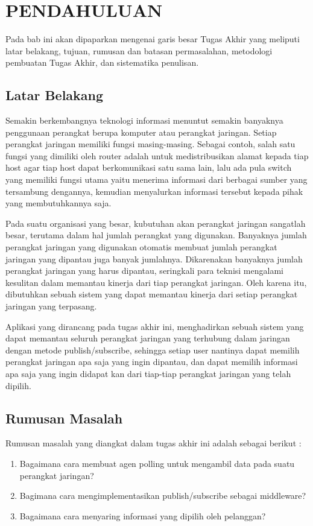 \chapter{PENDAHULUAN}
	Pada bab ini akan dipaparkan mengenai garis besar Tugas Akhir yang meliputi latar belakang, tujuan, rumusan dan batasan permasalahan, metodologi pembuatan Tugas Akhir, dan sistematika penulisan.
        
	\section{Latar Belakang}
		Semakin berkembangnya teknologi informasi menuntut semakin banyaknya penggunaan perangkat berupa komputer atau perangkat jaringan. Setiap perangkat jaringan memiliki fungsi masing-masing. Sebagai contoh, salah satu fungsi yang dimiliki oleh router adalah untuk medistribusikan alamat kepada tiap host agar tiap host dapat berkomunikasi satu sama lain, lalu ada pula switch yang memiliki fungsi utama yaitu menerima informasi dari berbagai sumber yang tersambung dengannya, kemudian menyalurkan informasi tersebut kepada pihak yang membutuhkannya saja.
		
		Pada suatu organisasi yang besar, kubutuhan akan perangkat jaringan sangatlah besar, terutama dalam hal jumlah perangkat yang digunakan. Banyaknya jumlah perangkat jaringan yang digunakan otomatis membuat jumlah perangkat jaringan yang dipantau juga banyak jumlahnya. Dikarenakan banyaknya jumlah perangkat jaringan yang harus dipantau, seringkali para teknisi mengalami kesulitan dalam memantau kinerja dari tiap perangkat jaringan. Oleh karena itu, dibutuhkan sebuah sistem yang dapat memantau kinerja dari setiap perangkat jaringan yang terpasang.
		
		Aplikasi yang dirancang pada tugas akhir ini, menghadirkan sebuah sistem yang dapat memantau seluruh perangkat jaringan yang terhubung dalam jaringan dengan metode publish/subscribe, sehingga setiap user nantinya dapat memilih perangkat jaringan apa saja yang ingin dipantau, dan dapat memilih informasi apa saja yang ingin didapat kan dari tiap-tiap perangkat jaringan yang telah dipilih.

	\section{Rumusan Masalah}
       	Rumusan masalah yang diangkat dalam tugas akhir ini adalah sebagai berikut :
		\begin{enumerate}
			\item Bagaimana cara membuat agen polling untuk mengambil data pada suatu perangkat jaringan?
			\item Bagimana cara mengimplementasikan publish/subscribe sebagai middleware?
            \item Bagaimana cara menyaring informasi yang dipilih oleh pelanggan?
		\end{enumerate}

